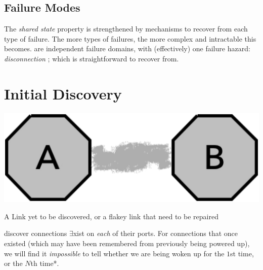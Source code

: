 \documentclass[../OAE-SPEC-MAIN.tex]{subfiles}
\begin{document}
\subsection{Failure Modes}

The \emph{shared state} property %
is strengthened by mechanisms to recover from each type of failure. The more types of failures, the more complex and intractable this becomes. \LINKs are independent failure domains, with (effectively) one failure hazard: \emph{disconnection} ; which is straightforward to recover from.








\section{Initial Discovery}

 \begin{marginfigure}
        \includegraphics[width=\linewidth]{../../FIGURES/Bipartite-discovery.pdf}
  \caption{A Link yet to be discovered, or a flakey link that need to be repaired}
      \vspace{12pt}
\end{marginfigure}


\CELLs discover connections $\exists$xist on \emph{each} of their ports. For connections that  once existed (which may have been remembered from previously being powered up), we will find it \emph{impossible} to tell whether we are being woken up for the $1$st time, or the $N$th time*. 
\end{document}
